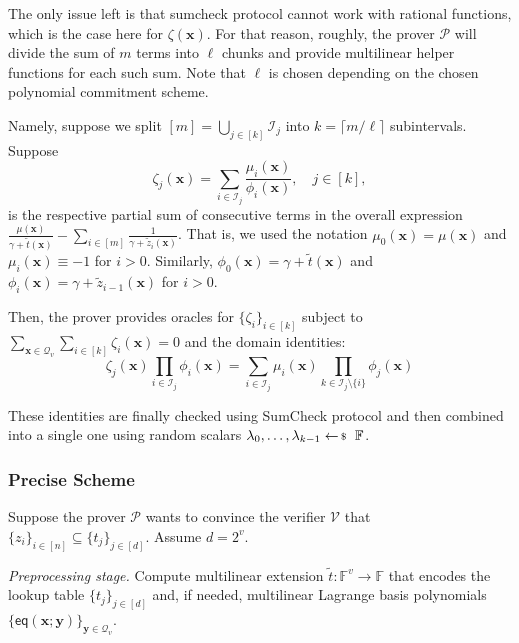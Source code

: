 The only issue left is that sumcheck protocol cannot work with rational
functions, which is the case here for $\zeta(\mathbf{x})$. For that reason,
roughly, the prover $\mathcal{P}$ will divide the sum of $m$ terms into $\ell$
chunks and provide multilinear helper functions for each such sum. Note that 
$\ell$ is chosen depending on the chosen polynomial commitment scheme. 

Namely, suppose we split $[m] = \bigcup_{j \in [k]}\mathcal{I}_j$ into $k=\lceil
m/\ell \rceil$ subintervals. Suppose 
\begin{equation*}
    \zeta_j(\mathbf{x}) = \sum_{i \in \mathcal{I}_j} \frac{\mu_i(\mathbf{x})}{\phi_i(\mathbf{x})}, \quad j \in [k],
\end{equation*}
is the respective partial sum of consecutive terms in the overall expression
$\frac{\mu(\mathbf{x})}{\gamma+\widetilde{t}(\mathbf{x})} - \sum_{i \in
[m]}\frac{1}{\gamma+\widetilde{z}_i(\mathbf{x})}$. That is, we used the notation
$\mu_0(\mathbf{x}) = \mu(\mathbf{x})$ and $\mu_i(\mathbf{x}) \equiv -1$ for
$i>0$. Similarly, $\phi_0(\mathbf{x}) = \gamma+\widetilde{t}(\mathbf{x})$ and
$\phi_i(\mathbf{x}) = \gamma +\widetilde{z}_{i-1}(\mathbf{x})$ for $i>0$.

Then, the prover provides oracles for $\{\zeta_i\}_{i \in [k]}$ subject to
$\sum_{\mathbf{x} \in \mathcal{Q}_v}\sum_{i \in [k]}\zeta_i(\mathbf{x}) = 0$
and the domain identities:
\begin{equation*}
    \zeta_j(\mathbf{x}) \prod_{i \in \mathcal{I}_j} \phi_i(\mathbf{x}) = \sum_{i \in \mathcal{I}_j}\mu_i(\mathbf{x})\prod_{k \in \mathcal{I}_j\setminus \{i\}} \phi_j(\mathbf{x})
\end{equation*}

These identities are finally checked using SumCheck protocol and then combined
into a single one using random scalars $\lambda_0,\dots,\lambda_{k-1}
\leftarrowS \mathbb{F}$.

\subsubsection{Precise Scheme}

Suppose the prover $\mathcal{P}$ wants to convince the verifier $\mathcal{V}$
that $\{z_i\}_{i \in [n]} \subseteq \{t_j\}_{j \in [d]}$. Assume $d=2^v$. 

\textit{Preprocessing stage.} Compute multilinear extension $\widetilde{t}:
\mathbb{F}^v \to \mathbb{F}$ that encodes the lookup table $\{t_j\}_{j \in [d]}$
and, if needed, multilinear Lagrange basis polynomials
$\{\mathsf{eq}(\mathbf{x};\mathbf{y})\}_{\mathbf{y} \in \mathcal{Q}_v}$.

